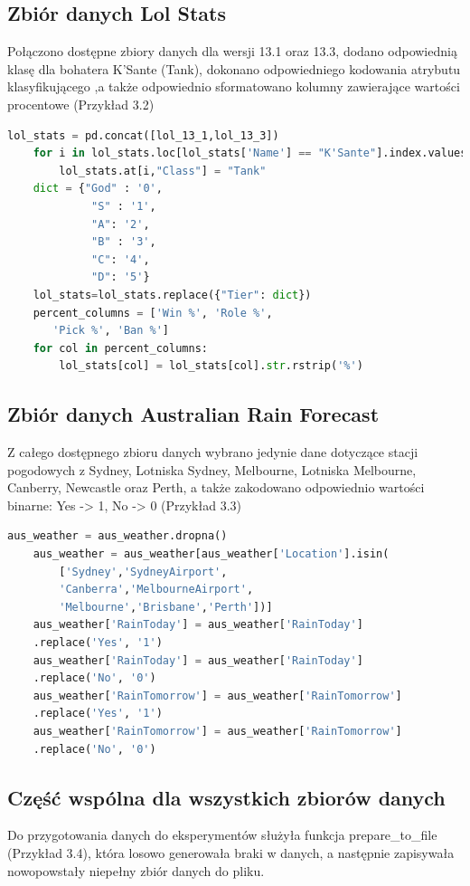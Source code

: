 \documentclass[oneside]{book}
\begin{document}
\subsection{Zbiór danych Lol Stats}
Połączono dostępne zbiory danych dla wersji 13.1 oraz 13.3, 
dodano odpowiednią klasę dla bohatera K'Sante (Tank), dokonano 
odpowiedniego kodowania atrybutu klasyfikującego 
,a także odpowiednio sformatowano kolumny 
zawierające wartości procentowe (Przykład 3.2)
\begin{lstlisting}[language=Python, caption={Przygotowanie zbioru danych Lol Stats do eksperymentów}, captionpos=b]
    lol_stats = pd.concat([lol_13_1,lol_13_3])
    for i in lol_stats.loc[lol_stats['Name'] == "K'Sante"].index.values:
        lol_stats.at[i,"Class"] = "Tank"
    dict = {"God" : '0',
             "S" : '1',
             "A": '2',
             "B" : '3',
             "C": '4',
             "D": '5'}
    lol_stats=lol_stats.replace({"Tier": dict})
    percent_columns = ['Win %', 'Role %',
       'Pick %', 'Ban %']
    for col in percent_columns:
        lol_stats[col] = lol_stats[col].str.rstrip('%')
\end{lstlisting}

\subsection{Zbiór danych Australian Rain Forecast}
Z całego dostępnego zbioru danych wybrano jedynie dane dotyczące stacji pogodowych z Sydney, Lotniska Sydney, Melbourne, 
Lotniska Melbourne, Canberry, Newcastle oraz Perth, 
a także zakodowano odpowiednio wartości binarne: Yes -> 1, No -> 0 (Przykład 3.3)

\begin{lstlisting}[language=Python, caption={Przygotowanie zbioru danych Australian Rain Forecast do eksperymentów}, captionpos=b]
    aus_weather = aus_weather.dropna()
    aus_weather = aus_weather[aus_weather['Location'].isin(
        ['Sydney','SydneyAirport',
        'Canberra','MelbourneAirport',
        'Melbourne','Brisbane','Perth'])]
    aus_weather['RainToday'] = aus_weather['RainToday']
    .replace('Yes', '1')
    aus_weather['RainToday'] = aus_weather['RainToday']
    .replace('No', '0')
    aus_weather['RainTomorrow'] = aus_weather['RainTomorrow']
    .replace('Yes', '1')
    aus_weather['RainTomorrow'] = aus_weather['RainTomorrow']
    .replace('No', '0')
\end{lstlisting}

\subsection{Część wspólna dla wszystkich zbiorów danych}
Do przygotowania danych do eksperymentów służyła 
funkcja prepare\_to\_file (Przykład 3.4), która losowo 
generowała braki w danych, a następnie 
zapisywała nowopowstały niepełny zbiór danych do pliku.
\end{document}
